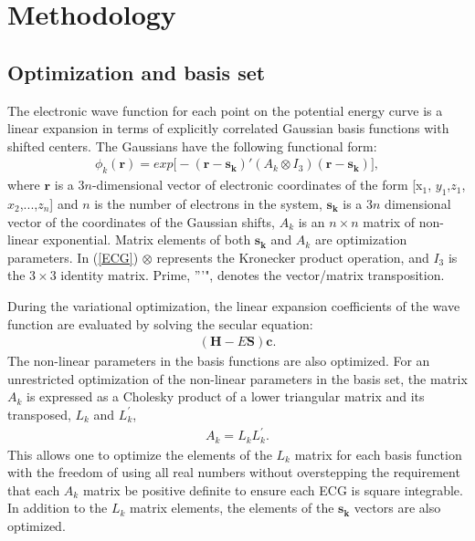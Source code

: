 \documentclass[aps,onecolumn]{revtex4}
\begin{document}

\section{Methodology}
\label{MTD}
\subsection{Optimization and basis set}
The electronic wave function for each point on the potential energy curve is a
linear expansion in terms of explicitly correlated Gaussian basis functions with shifted centers.
The Gaussians have the following
functional form:
\begin{eqnarray}
\phi_k(\mathbf{r}) = exp\Big[-(\mathbf{r - s_k})'(A_k\otimes I_3)(\mathbf{r - s_k})\Big], 
\label{ECG}
\end{eqnarray}
where $\mathbf{r}$ is a $3n$-dimensional vector of electronic coordinates of the form [x$_1$,
$y_1$,$z_1$,$x_2$,...,$z_n$] and $n$ is the number of electrons in the system, $\mathbf{s_k}$
is a $3n$ dimensional vector of the coordinates of the Gaussian shifts, $A_k$ is an $n \times n$ 
matrix of non-linear exponential. Matrix elements of both $\mathbf{s_k}$ and $A_k$ are 
optimization parameters.
In (\ref{ECG}) $\otimes$ represents the Kronecker product operation, and
$I_3$ is the $3 \times 3$ identity matrix.
Prime, '''", denotes the vector/matrix transposition.

During the variational optimization, the linear expansion coefficients 
of the wave function 
are evaluated by solving the secular equation:
\begin{eqnarray}
(\mathbf{H} - E\mathbf{S})\mathbf{c}.
\end{eqnarray}
The non-linear parameters in the basis functions are also optimized. For an unrestricted
optimization of the non-linear parameters in the basis set, the matrix $A_k$ is
expressed as a Cholesky product of a lower triangular matrix and its transposed, $ L_k $ and $ L_k^{\prime} $,
\begin{eqnarray}
A_k = L_k L_k^{\prime}.
\end{eqnarray}
This allows one to optimize the elements of the $L_k$ matrix for each basis function with the freedom
of using all real numbers without overstepping the requirement that each $A_k$ matrix be positive definite
to ensure each ECG is square integrable. In addition to the $L_k$ matrix elements, the
elements of the $\mathbf{s_k}$ vectors are also optimized.
\end{document}

